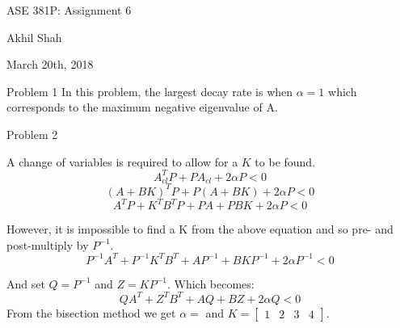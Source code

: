 \documentclass{article}
\begin{document}
\begin{center}
	{\huge ASE 381P: Assignment 6}
\end{center}
\begin{center}
	Akhil Shah
\end{center}
\begin{center}
	March 20th, 2018
\end{center}

\noindent
{\large Problem 1}
\newline 
In this problem, the largest decay rate is when $\alpha = 1$ which corresponds to the maximum negative eigenvalue of A. 


\newpage
\noindent
{\large Problem 2}
\newline

A change of variables is required to allow for a $K$ to be found.
$$ A_{cl}^TP + PA_{cl} + 2\alpha P < 0 $$
$$ (A + BK)^TP + P(A + BK) + 2\alpha P < 0 $$
$$ A^TP + K^TB^TP + PA + PBK + 2\alpha P < 0 $$

However, it is impossible to find a K from the above equation and so pre- and post-multiply by $P^{-1}$. 
$$ P^{-1}A^T + P^{-1}K^TB^T + AP^{-1} + BKP^{-1} + 2\alpha P^{-1} < 0 $$

And set $Q = P^{-1}$ and $Z = KP^{-1}$. Which becomes:
$$ QA^T + Z^TB^T + AQ + BZ + 2\alpha Q < 0 $$
From the bisection method we get $\alpha = $ and $ K = \begin{bmatrix} 1 & 2 & 3 & 4 \end{bmatrix} $. 


\end{document}
